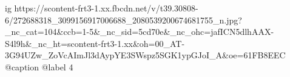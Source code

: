  
 
 
 
 

\ifcmt
  ig https://scontent-frt3-1.xx.fbcdn.net/v/t39.30808-6/272688318_3099156917006688_2080539200674681755_n.jpg?_nc_cat=104&ccb=1-5&_nc_sid=5cd70e&_nc_ohc=jafICN5dlhAAX-S4l9h&_nc_ht=scontent-frt3-1.xx&oh=00_AT-3G94UZw_ZoVcAImJl3dAypYE3SWspz5SGK1ypGJoI_A&oe=61FB8EEC
  @caption @label 4
\fi
